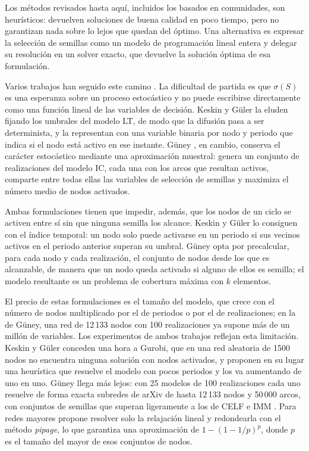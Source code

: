 \documentclass[12pt,twoside,titlepage]{report}
\begin{document}
Los métodos revisados hasta aquí, incluidos los basados en comunidades, son heurísticos: devuelven soluciones de buena calidad en poco tiempo, pero no garantizan nada sobre lo lejos que quedan del óptimo.
Una alternativa es expresar la selección de semillas como un modelo de programación lineal entera y delegar su resolución en un solver exacto, que devuelve la solución óptima de esa formulación.

Varios trabajos han seguido este camino \cite{keskin2018influence, wu2018two, guney2019efficient}.
La dificultad de partida es que $\sigma(S)$ es una esperanza sobre un proceso estocástico y no puede escribirse directamente como una función lineal de las variables de decisión.
Keskin y Güler \cite{keskin2018influence} la eluden fijando los umbrales del modelo LT, de modo que la difusión pasa a ser determinista, y la representan con una variable binaria por nodo y periodo que indica si el nodo está activo en ese instante.
Güney \cite{guney2019efficient}, en cambio, conserva el carácter estocástico mediante una aproximación muestral: genera un conjunto de realizaciones del modelo IC, cada una con los arcos que resultan activos, comparte entre todas ellas las variables de selección de semillas y maximiza el número medio de nodos activados.

Ambas formulaciones tienen que impedir, además, que los nodos de un ciclo se activen entre sí sin que ninguna semilla los alcance.
Keskin y Güler lo consiguen con el índice temporal: un nodo solo puede activarse en un periodo si sus vecinos activos en el periodo anterior superan su umbral.
Güney opta por precalcular, para cada nodo y cada realización, el conjunto de nodos desde los que es alcanzable, de manera que un nodo queda activado si alguno de ellos es semilla; el modelo resultante es un problema de cobertura máxima con $k$ elementos.

El precio de estas formulaciones es el tamaño del modelo, que crece con el número de nodos multiplicado por el de periodos o por el de realizaciones; en la de Güney, una red de 12\,133 nodos con 100 realizaciones ya supone más de un millón de variables.
Los experimentos de ambos trabajos reflejan esta limitación.
Keskin y Güler conceden una hora a Gurobi, que en una red aleatoria de 1500 nodos no encuentra ninguna solución con nodos activados, y proponen en su lugar una heurística que resuelve el modelo con pocos periodos y los va aumentando de uno en uno.
Güney llega más lejos: con 25 modelos de 100 realizaciones cada uno resuelve de forma exacta subredes de arXiv de hasta 12\,133 nodos y 50\,000 arcos, con conjuntos de semillas que superan ligeramente a los de CELF \cite{leskovec2007cost} e IMM \cite{tang2015influence}.
Para redes mayores propone resolver solo la relajación lineal y redondearla con el método \textit{pipage}, lo que garantiza una aproximación de $1-(1-1/p)^p$, donde $p$ es el tamaño del mayor de esos conjuntos de nodos.
\end{document}
